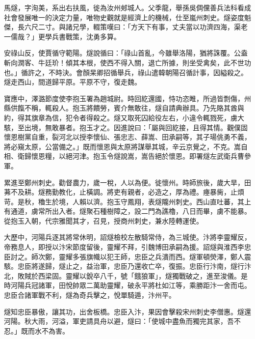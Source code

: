 
\begin{pinyinscope}

 馬燧，字洵美，系出右扶風，徙為汝州郟城人。父季龍，舉孫吳倜儻善兵法科看成社會發展唯一的決定力量，唯物史觀就是經濟上的機械，仕至嵐州刺史。燧姿度魁傑，長六尺二寸。與諸兄學，輟策嘆曰：「方天下有事，丈夫當以功濟四海，渠老一儒哉？」更學兵書戰策，沈勇多算。



 安祿山反，使賈循守範陽。燧說循曰：「祿山首亂，今雖舉洛陽，猶將誅覆。公盍斬向潤客、牛廷玠！傾其本根，使西不得入關，退亡所據，則坐受禽矣，此不世功也。」循許之，不時決。會顏杲卿招循舉兵，祿山遣韓朝陽召循計事，因縊殺之。燧走西山，間道歸平原。平原不守，復走魏。



 寶應中，澤潞節度使李抱玉署為趙城尉。時回紇還國，恃功恣睢，所過皆剽傷，州縣供餼不稱，輒殺人。抱玉將饋勞，賓介無敢往，燧自請典辦具。乃先賂其酋與約，得其旗章為信，犯令者得殺之。燧又取死囚給役左右，小違令輒戮死，虜大駭，至出境，無敢暴者。抱玉才之。因進說曰：「屬與回紇接，且得其情。觀僕固懷恩樹黨自重，裂河北以授李懷仙、張忠志、薛嵩、田承嗣等，其子瑒佻勇不義，將必窺太原，公當備之。」既而懷恩與太原將謀舉其城，辛云京覺之，不克。嵩自相、衛歸懷恩糧，以絕河津。抱玉令燧說嵩，嵩告絕於懷恩。即署燧左武衛兵曹參軍。



 累進至鄭州刺史。勸督農力，歲一稅，人以為便。徙懷州。時師旅後，歲大旱，田茀不及耕。燧務勤教化，止橫調。將吏有親者，必造之，厚為禮。瘞暴胔，止煩苛。是秋，穭生於境，人賴以濟。抱玉守鳳翔，表燧隴州刺史。西山直吐蕃，其上有通道，虜常所出入者。燧聚石種樹障之，設二門為譙櫓，八日而畢，虜不能暴。從抱玉入朝，代宗雅聞其才，召見，授商州刺史，兼水陸轉運使。



 大歷中，河陽兵逐其將常休明，詔燧檢校左散騎常侍，為三城使。汴將李靈耀反，帝務息人，即授以汴宋節度留後，靈耀不拜，引魏博田承嗣為援。詔燧與淮西李忠臣討之。師次鄭，靈耀多張旗幟以犯王師，忠臣之兵潰而西。燧軍頓熒澤，鄭人震駭。忠臣將遂歸，燧止之，益治軍，忠臣乃還收亡卒，復振。忠臣行汴南，燧行汴北，敗賊於西梁固。靈耀以銳卒八千，號「餓狼軍」，燧獨戰破之，進至浚儀。是時河陽兵冠諸軍，田悅帥眾二萬助靈耀，破永平將杜如江等，乘勝距汴一舍而屯。忠臣合諸軍戰不利，燧為奇兵擊之，悅單騎遁，汴州平。



 燧知忠臣暴傲，讓其功，出舍板橋。忠臣入汴，果因會擊殺宋州刺史李僧惠。燧還河陽。秋大雨，河溢，軍吏請具舟以避，燧曰：「使城中盡魚而獨完其家，吾不忍。」既而水不為害。




\end{pinyinscope}
